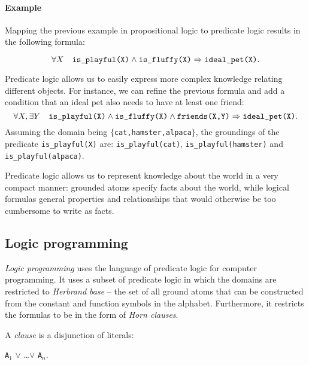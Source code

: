 \paragraph{Example} Mapping the previous example in propositional logic to predicate logic results in the following formula:

$$\forall X \quad \text{\texttt{is\_playful(X)}} \wedge \text{\texttt{is\_fluffy(X)}} \Rightarrow \text{\texttt{ideal\_pet(X)}}. $$

 Predicate logic allows us to easily express more complex knowledge relating different objects.
 For instance, we can refine the previous formula and add a condition that an ideal pet also needs to have at least one friend:
 $$\forall X, \exists Y \quad \text{\texttt{is\_playful(X)}} \wedge \text{\texttt{is\_fluffy(X)}} \wedge \text{\texttt{friends(X,Y)}} \Rightarrow \text{\texttt{ideal\_pet(X)}}. $$
 Assuming the domain being $\{$\texttt{cat,hamster,alpaca}$\}$, the groundings of the predicate \texttt{is\_playful(X)} are: \texttt{is\_playful(cat)}, \texttt{is\_playful(hamster)} and \texttt{is\_playful(alpaca)}.




 Predicate logic allows us to represent knowledge about the world in a very compact manner: grounded atoms specify facts about the world, while logical formulas general properties and relationships that would otherwise be too cumbersome to write as facts.










\subsection{Logic programming}


\textit{Logic programming} uses the language of predicate logic for computer programming.
It uses a subset of predicate logic in which the domains are restricted to \textit{Herbrand base} -- the set of all ground atoms that can be constructed from the constant and function symbols in the alphabet.
Furthermore, it restricts the formulas to be in the form of \textit{Horn clauses}.


A \textit{clause} is a disjunction of literals:

\begin{center}
	\texttt{A}$_1$  $\vee$ \ldots $\vee$ \texttt{A}$_n$.
\end{center}


